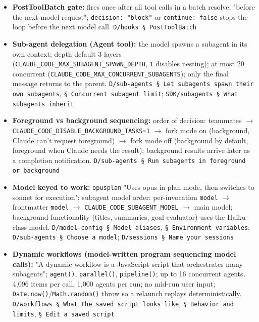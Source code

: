 \begin{itemize}
\item \textbf{PostToolBatch gate:} fires once after all tool calls in a batch resolve, "before the next model request"; \texttt{decision:\allowbreak{} "block"} or \texttt{continue:\allowbreak{} false} stops the loop before the next model call. \texttt{D/\allowbreak{}hooks § PostToolBatch}
\item \textbf{Sub-agent delegation (Agent tool):} the model spawns a subagent in its own context; depth default 3 layers (\texttt{CLAUDE\_\allowbreak{}CODE\_\allowbreak{}MAX\_\allowbreak{}SUBAGENT\_\allowbreak{}SPAWN\_\allowbreak{}DEPTH}, \texttt{1} disables nesting); at most 20 concurrent (\texttt{CLAUDE\_\allowbreak{}CODE\_\allowbreak{}MAX\_\allowbreak{}CONCURRENT\_\allowbreak{}SUBAGENTS}); only the final message returns to the parent. \texttt{D/\allowbreak{}sub-\allowbreak{}agents § Let subagents spawn their own subagents}, \texttt{§ Concurrent subagent limit}; \texttt{SDK/\allowbreak{}subagents § What subagents inherit}
\item \textbf{Foreground vs background sequencing:} order of decision: teammates $\rightarrow$ \texttt{CLAUDE\_\allowbreak{}CODE\_\allowbreak{}DISABLE\_\allowbreak{}BACKGROUND\_\allowbreak{}TASKS=1} $\rightarrow$ fork mode on (background, Claude can't request foreground) $\rightarrow$ fork mode off (background by default, foreground when Claude needs the result); background results arrive later as a completion notification. \texttt{D/\allowbreak{}sub-\allowbreak{}agents § Run subagents in foreground or background}
\item \textbf{Model keyed to work:} \texttt{opusplan} "Uses opus in plan mode, then switches to sonnet for execution"; subagent model order: per-invocation \texttt{model} $\rightarrow$ frontmatter \texttt{model} $\rightarrow$ \texttt{CLAUDE\_\allowbreak{}CODE\_\allowbreak{}SUBAGENT\_\allowbreak{}MODEL} $\rightarrow$ main model; background functionality (titles, summaries, goal evaluator) uses the Haiku-class model. \texttt{D/\allowbreak{}model-\allowbreak{}config § Model aliases}, \texttt{§ Environment variables}; \texttt{D/\allowbreak{}sub-\allowbreak{}agents § Choose a model}; \texttt{D/\allowbreak{}sessions § Name your sessions}
\item \textbf{Dynamic workflows (model-written program sequencing model calls):} "A dynamic workflow is a JavaScript script that orchestrates many subagents"; \texttt{agent(\allowbreak{})}, \texttt{parallel(\allowbreak{})}, \texttt{pipeline(\allowbreak{})}; up to 16 concurrent agents, 4,096 items per call, 1,000 agents per run; no mid-run user input; \texttt{Date.\allowbreak{}now(\allowbreak{})}/\texttt{Math.\allowbreak{}random(\allowbreak{})} throw so a relaunch replays deterministically. \texttt{D/\allowbreak{}workflows § What the saved script looks like}, \texttt{§ Behavior and limits}, \texttt{§ Edit a saved script}

\end{itemize}
